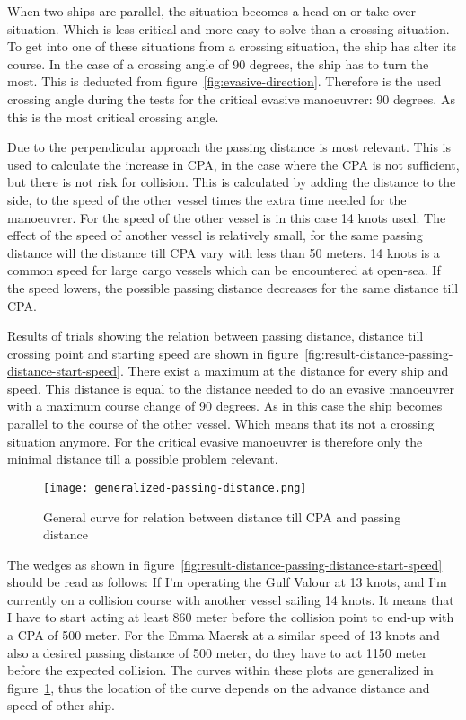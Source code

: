 When two ships are parallel, the situation becomes a head-on or take-over situation. Which is less critical and more easy to solve than a crossing situation. To get into one of these situations from a crossing situation, the ship has alter its course. In the case of a crossing angle of 90 degrees, the ship has to turn the most. This is deducted from figure~\ref{fig:evasive-direction}.
Therefore is the used crossing angle during the tests for the critical evasive manoeuvrer: 90 degrees. As this is the most critical crossing angle.

Due to the perpendicular approach the passing distance is most relevant. This is used to calculate the increase in CPA, in the case where the CPA is not sufficient, but there is not risk for collision. This is calculated by adding the distance to the side, to the speed of the other vessel times the extra time needed for the manoeuvrer. For the speed of the other vessel is in this case 14 knots used. The effect of the speed of another vessel is relatively small, for the same passing distance will the distance till CPA vary with less than 50 meters. 14 knots is a common speed for large cargo vessels which can be encountered at open-sea. If the speed lowers, the possible passing distance decreases for the same distance till CPA. 

Results of trials showing the relation between passing distance, distance till crossing point and starting speed are shown in figure~\ref{fig:result-distance-passing-distance-start-speed}.
There exist a maximum at the distance for every ship and speed. This distance is equal to the distance needed to do an evasive manoeuvrer with a maximum course change of 90 degrees. As in this case the ship becomes parallel to the course of the other vessel. Which means that its not a crossing situation anymore. For the critical evasive manoeuvrer is therefore only the minimal distance till a possible problem relevant.

\begin{figure}[hp]
	\centering
	\texttt{[image: generalized-passing-distance.png]}
	\caption{General curve for relation between distance till CPA and passing distance}
	\label{fig:general-advance} 
\end{figure}

The wedges as shown in figure~\ref{fig:result-distance-passing-distance-start-speed} should be read as follows: If I'm operating the Gulf Valour at 13 knots, and I'm currently on a collision course with another vessel sailing 14 knots. It means that I have to start acting at least 860 meter before the collision point to end-up with a \ac{CPA} of 500 meter.
For the Emma Maersk at a similar speed of 13 knots and also a desired passing distance of 500 meter, do they have to act 1150 meter before the expected collision. The curves within these plots are generalized in figure~\ref{fig:general-advance}, thus the location of the curve depends on the advance distance and speed of other ship.

